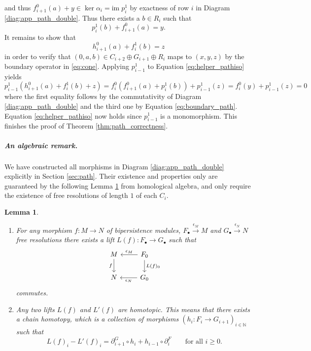 \documentclass[11pt]{article}
\newtheorem{lemma}[theorem]{Lemma}
\newcommand{\define}[1]{\emph{#1}} %
\newcommand{\im}{\mathrm{im}\;}
\begin{document}
and thus $f^0_{i+1}(a)+y\in \ker \alpha_i = \im p^1_i$ by exactness of row $i$ in Diagram \eqref{diag:app_path_double}. Thus there exists a $b\in R_i$ such that
\begin{equation*}
    p^1_i(b)+f^0_{i+1}(a)=y.
\end{equation*}
It remains to show that 
\begin{equation}
    \label{eq:helper_pathiso}
    h^0_{i+1}(a)+f^1_i(b)=z
\end{equation}
in order to verify that $(0,a,b)\in C_{i+2}\oplus G_{i+1}\oplus R_{i}$ maps to $(x,y,z)$ by the boundary operator in \eqref{eq:cone}. Applying $p^1_{i-1}$ to Equation \eqref{eq:helper_pathiso} yields
\begin{equation*}
    p^1_{i-1}(h^0_{i+1}(a)+f^1_i(b)+z)=f^0_i(f^0_{i+1}(a)+p^1_i(b))+p^1_{i-1}(z) =                       f^0_i(y)+p^1_{i-1}(z) =0
\end{equation*}
where the first equality follows by the commutativity of Diagram \eqref{diag:app_path_double} and the third one by Equation \eqref{eq:boundary_path}. Equation \eqref{eq:helper_pathiso} now holds since $p^1_{i-1}$ is a monomorphism. This finishes the proof of Theorem \ref{thm:path_correctness}. 
%
\subparagraph{An algebraic remark.}
%
We have constructed all morphisms in Diagram \eqref{diag:app_path_double} explicitly in Section \ref{sec:path}. Their existence and properties only are guaranteed by the following Lemma \ref{lem:fundamental_lemma} from homological algebra, and only require the existence of free resolutions of length $1$ of each $C_i$.
\begin{lemma}
    \label{lem:fundamental_lemma}
    \begin{enumerate}[label=(\roman*)]
        \item For any morphism $f:M\rightarrow N$ of bipersistence modules, $F_\bullet\xrightarrow{\epsilon_M} M$ and $G_\bullet \xrightarrow{\epsilon_N} N$ free resolutions there exists a \define{lift} $L(f):F_\bullet \rightarrow G_\bullet$ such that 
        \begin{equation*}
            \begin{tikzcd}
M \arrow[d, "f"'] & F_0 \arrow[l, "\epsilon_M"'] \arrow[d, "L(f)_0"] \\
N                 & G_0 \arrow[l, "\epsilon_N"]                     
\end{tikzcd}
        \end{equation*}
        commutes. 
        \item Any two lifts $L(f)$ and $L'(f)$ are homotopic. This means that there exists a \define{chain homotopy}, which is a collection of morphisms $(h_i:F_i\rightarrow G_{i+1})_{i\in \mathbb{N}}$ such that 
        \begin{equation*}
        L(f)_i-L'(f)_i=\partial^G_{i+1}\circ h_i+h_{i-1}\circ \partial^F_i \qquad \text{for all }i\geq 0.
        \end{equation*}
    \end{enumerate} 
\end{lemma}
\end{document}
